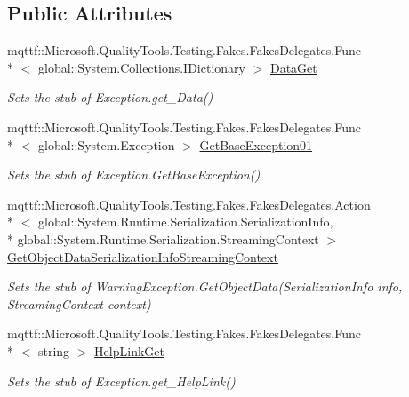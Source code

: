 \subsection*{Public Attributes}
\begin{DoxyCompactItemize}
\item 
mqttf\-::\-Microsoft.\-Quality\-Tools.\-Testing.\-Fakes.\-Fakes\-Delegates.\-Func\\*
$<$ global\-::\-System.\-Collections.\-I\-Dictionary $>$ \hyperlink{class_system_1_1_component_model_1_1_fakes_1_1_stub_warning_exception_a394cc4387faf5620a0272481a4c9d093}{Data\-Get}
\begin{DoxyCompactList}\small\item\em Sets the stub of Exception.\-get\-\_\-\-Data()\end{DoxyCompactList}\item 
mqttf\-::\-Microsoft.\-Quality\-Tools.\-Testing.\-Fakes.\-Fakes\-Delegates.\-Func\\*
$<$ global\-::\-System.\-Exception $>$ \hyperlink{class_system_1_1_component_model_1_1_fakes_1_1_stub_warning_exception_aa1c930c36b897743c32580ca40976a59}{Get\-Base\-Exception01}
\begin{DoxyCompactList}\small\item\em Sets the stub of Exception.\-Get\-Base\-Exception()\end{DoxyCompactList}\item 
mqttf\-::\-Microsoft.\-Quality\-Tools.\-Testing.\-Fakes.\-Fakes\-Delegates.\-Action\\*
$<$ global\-::\-System.\-Runtime.\-Serialization.\-Serialization\-Info, \\*
global\-::\-System.\-Runtime.\-Serialization.\-Streaming\-Context $>$ \hyperlink{class_system_1_1_component_model_1_1_fakes_1_1_stub_warning_exception_a6a9d632f7f4c3968c7fa9be3d640a6ab}{Get\-Object\-Data\-Serialization\-Info\-Streaming\-Context}
\begin{DoxyCompactList}\small\item\em Sets the stub of Warning\-Exception.\-Get\-Object\-Data(\-Serialization\-Info info, Streaming\-Context context)\end{DoxyCompactList}\item 
mqttf\-::\-Microsoft.\-Quality\-Tools.\-Testing.\-Fakes.\-Fakes\-Delegates.\-Func\\*
$<$ string $>$ \hyperlink{class_system_1_1_component_model_1_1_fakes_1_1_stub_warning_exception_a6e006bacf989a5aa0e340f4fff0bb7dd}{Help\-Link\-Get}
\begin{DoxyCompactList}\small\item\em Sets the stub of Exception.\-get\-\_\-\-Help\-Link()\end{DoxyCompactList}\item 

\end{DoxyCompactItemize}

